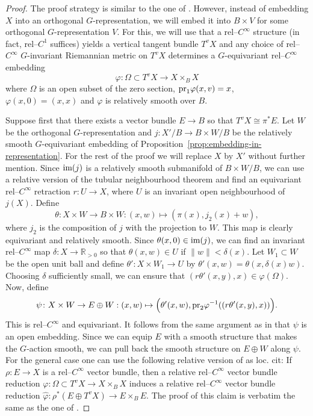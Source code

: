 \documentclass[11pt,psamsfonts, oneside, reqno]{amsart}
\newcommand{\sub}{\subset}%
\newcommand{\inv}{^{-1}}
\newcommand{\norm}[1]{\lVert#1\rVert}
\newcommand{\cl}{\colon}
\newcommand{\lbr}[1]{\Bigl(#1\Bigr)}
\newcommand{\im}{\normalfont\text{im}}
\newcommand{\pr}{\normalfont\text{pr}}
\newcommand{\bR}{\mathbb{R}}
\newcommand{\wh}{\widehat}
\theoremstyle{definition}
\theoremstyle{remark}
\numberwithin{equation}{section}
\begin{document}
\begin{proof} The proof strategy is similar to the one of \cite[Theorem~1.3]{Las79}. However, instead of embedding $X$ into an orthogonal $G$-representation, we will embed it into $B\times V$ for some orthogonal $G$-representation $V$. For this, we will use that a rel--$C^\infty$ structure (in fact, rel--$C^1$ suffices) yields a vertical tangent bundle $T^vX$ and any choice of rel--$C^\infty$ $G$-invariant Riemannian metric on $T^vX$ determines a $G$-equivariant rel--$C^\infty$ embedding 
	\begin{equation}\label{} \varphi \cl \Omega\sub T^vX \to X\times_B X
	\end{equation}
	where $\Omega$ is an open subset of the zero section, $\pr_1\varphi(x,v) = x$, $\varphi(x,0) = (x,x)$ and $\varphi$ is relatively smooth over $B$.\par 
	Suppose first that there exists a vector bundle $E \to B$ so that $T^vX \cong \pi^*E$. Let $W$ be the orthogonal $G$-representation and $j \cl X'/B\to B\times W/B$ be the relatively smooth $G$-equivariant embedding of Proposition~\ref{prop:embedding-in-representation}. For the rest of the proof we will replace $X$ by $X'$ without further mention. Since $\im(j)$ is a relatively smooth submanifold of $B\times W/B$, we can use a relative version of the tubular neighbourhood theorem and find an equivariant rel--$C^\infty$ retraction $r \cl U\to X$, where $U$ is an invariant open neighbourhood of $j(X)$. Define 
	\begin{equation}\label{} 
		\theta \cl X\times W\to B\times W : (x,w)\mapsto (\pi(x),j_2(x)+w),
	\end{equation}
where $j_2$ is the composition of $j$ with the projection to $W$. This map is clearly equivariant and relatively smooth. Since $\theta(x,0) \in \im(j)$, we can find an invariant rel--$C^\infty$ map $\delta \cl X\to \bR_{> 0}$ so that $\theta(x,w)\in U$ if $\norm{w} < \delta(x)$. Let $W_1\sub W$ be the open unit ball and define $\theta'\cl X\times W_1\to U$ by $\theta'(x,w) = \theta(x,\delta(x)w)$. Choosing $\delta$ sufficiently small, we can ensure that $(r\theta'(x,y),x)\in \varphi(\Omega)$. Now, define 
\begin{equation}\label{}
	\psi \cl X\times W\to E\oplus W:  (x,w)\mapsto \lbr{\theta'(x,w),\pr_2\varphi\inv((r\theta'(x,y),x))}.
\end{equation}
This is rel--$C^\infty$ and equivariant. It follows from the same argument as in \cite[Theorem~1.3]{Las79} that $\psi$ is an open embedding. Since we can equip $E$ with a smooth structure that makes the $G$-action smooth, we can pull back the smooth structure on $E\oplus W$ along $\psi$. For the general case one can use the following relative version of \cite{Las79} as loc. cit: If $\rho \cl E\to X$ is a rel--$C^\infty$ vector bundle, then a relative rel--$C^\infty$ vector bundle reduction $\varphi\cl \Omega\sub T^vX\to X\times_B X$ induces a relative rel--$C^\infty$ vector bundle reduction $\wh\varphi\cl \rho^*(E\oplus T^vX)\to E\times_B E$. The proof of this claim is verbatim the same as the one of \cite[Lemma~1.6]{Las79}.\par 

\end{proof}
\end{document}
